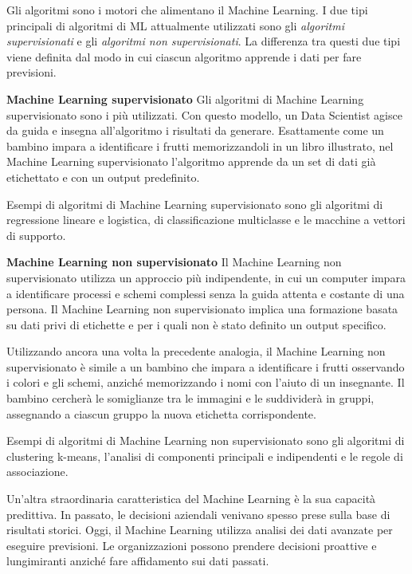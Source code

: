 Gli algoritmi sono i motori che alimentano il Machine Learning. I due tipi principali di algoritmi di ML attualmente utilizzati sono gli \emph{algoritmi supervisionati} e gli \emph{algoritmi non supervisionati}. La differenza tra questi due tipi viene definita dal modo in cui ciascun algoritmo apprende i dati per fare previsioni.

\newpage\textbf{Machine Learning supervisionato}\newline	
Gli algoritmi di Machine Learning supervisionato sono i più utilizzati. Con questo modello, un Data Scientist agisce da guida e insegna all'algoritmo i risultati da generare. Esattamente come un bambino impara a identificare i frutti memorizzandoli in un libro illustrato, nel Machine Learning supervisionato l'algoritmo apprende da un set di dati già etichettato e con un output predefinito.

Esempi di algoritmi di Machine Learning supervisionato sono gli algoritmi di regressione lineare e logistica, di classificazione multiclasse e le macchine a vettori di supporto.\newline

\textbf{Machine Learning non supervisionato}\newline
Il Machine Learning non supervisionato utilizza un approccio più indipendente, in cui un computer impara a identificare processi e schemi complessi senza la guida attenta e costante di una persona. Il Machine Learning non supervisionato implica una formazione basata su dati privi di etichette e per i quali non è stato definito un output specifico.

Utilizzando ancora una volta la precedente analogia, il Machine Learning non supervisionato è simile a un bambino che impara a identificare i frutti osservando i colori e gli schemi, anziché memorizzando i nomi con l'aiuto di un insegnante. Il bambino cercherà le somiglianze tra le immagini e le suddividerà in gruppi, assegnando a ciascun gruppo la nuova etichetta corrispondente.

Esempi di algoritmi di Machine Learning non supervisionato
sono gli algoritmi di clustering k-means, l'analisi di componenti principali e indipendenti e le regole di associazione.

Un'altra straordinaria caratteristica del Machine Learning è la sua capacità predittiva. In passato, le decisioni aziendali venivano spesso prese sulla base di risultati storici. Oggi, il Machine Learning utilizza analisi dei dati avanzate per eseguire previsioni. Le organizzazioni possono prendere decisioni proattive e lungimiranti anziché fare affidamento sui dati passati.

